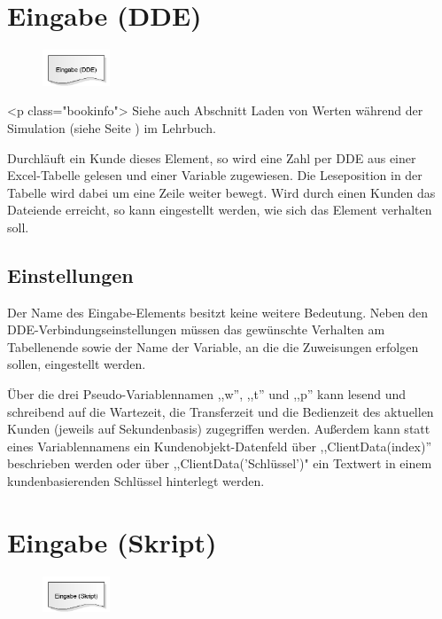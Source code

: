 \section{Eingabe (DDE)}
\label{ref:ModelElementInputDDE}

\begin{figure}
\vspace{-22pt}
\includegraphics[width=2cm]{imageModelElementInputDDE.png}
\vspace{-22pt}
\end{figure}

<p class="bookinfo">
Siehe auch Abschnitt Laden von Werten während der Simulation (siehe Seite \pageref{ref:book:9.3.2}) im Lehrbuch.

Durchläuft ein Kunde dieses Element, so wird eine Zahl per DDE aus einer Excel-Tabelle gelesen und einer
Variable zugewiesen. Die Leseposition in der Tabelle wird dabei um eine Zeile weiter bewegt.
Wird durch einen Kunden das Dateiende erreicht, so kann eingestellt werden, wie sich
das Element verhalten soll.

\subsection*{Einstellungen}

Der Name des Eingabe-Elements besitzt keine weitere Bedeutung. Neben den DDE-Verbindungseinstellungen
müssen das gewünschte Verhalten am Tabellenende
sowie der Name der Variable, an die die Zuweisungen erfolgen sollen, eingestellt werden.

Über die drei Pseudo-Variablennamen ,,w'', ,,t'' und ,,p'' kann lesend und schreibend auf die Wartezeit, die Transferzeit
und die Bedienzeit des aktuellen Kunden (jeweils auf Sekundenbasis) zugegriffen werden. Außerdem kann statt eines
Variablennamens ein Kundenobjekt-Datenfeld über ,,ClientData(index)'' beschrieben werden oder über ,,ClientData('Schlüssel')"
ein Textwert in einem kundenbasierenden Schlüssel hinterlegt werden.


\section{Eingabe (Skript)}
\label{ref:ModelElementInputJS}

\begin{figure}
\vspace{-22pt}
\includegraphics[width=2cm]{imageModelElementInputJS.png}
\vspace{-22pt}
\end{figure}

